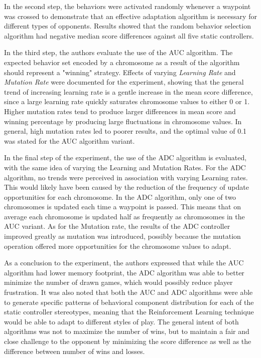 In the second step, the behaviors were activated randomly whenever a waypoint was crossed to demonstrate that an effective adaptation algorithm is necessary for different types of opponents. Results showed that the random behavior selection algorithm had negative median score differences against all five static controllers.

In the third step, the authors evaluate the use of the AUC algorithm. The expected behavior set encoded by a chromosome as a result of the algorithm should represent a "winning" strategy. Effects of varying \emph{Learning Rate} and \emph{Mutation Rate} were documented for the experiment, showing that the general trend of increasing learning rate is a gentle increase in the mean score difference, since a large learning rate quickly saturates chromosome values to either 0 or 1. Higher mutation rates tend to produce larger differences in mean score and winning percentage by producing large fluctuations in chromosome values. In general, high mutation rates led to poorer results, and the optimal value of 0.1 was stated for the AUC algorithm variant.

In the final step of the experiment, the use of the ADC algorithm is evaluated, with the same idea of varying the Learning and Mutation Rates. For the ADC algorithm, no trends were perceived in association with varying Learning rates. This would likely have been caused by the reduction of the frequency of update opportunities for each chromosome. In the ADC algorithm, only one of two chromosomes is updated each time a waypoint is passed. This means that on average each chromosome is updated half as frequently as chromosomes in the AUC variant. As for the Mutation rate, the results of the ADC controller improved greatly as mutation was introduced, possibly because the mutation operation offered more opportunities for the chromosome values to adapt.

As a conclusion to the experiment, the authors expressed that while the AUC algorithm had lower memory footprint, the ADC algorithm was able to better minimize the number of drawn games, which would possibly reduce player frustration. It was also noted that both the AUC and ADC algorithms were able to generate specific patterns of behavioral component distribution for each of the static controller stereotypes, meaning that the Reinforcement Learning technique would be able to adapt to different styles of play. The general intent of both algorithms was not to maximize the number of wins, but to maintain a fair and close challenge to the opponent by minimizing the score difference as well as the difference between number of wins and losses.


